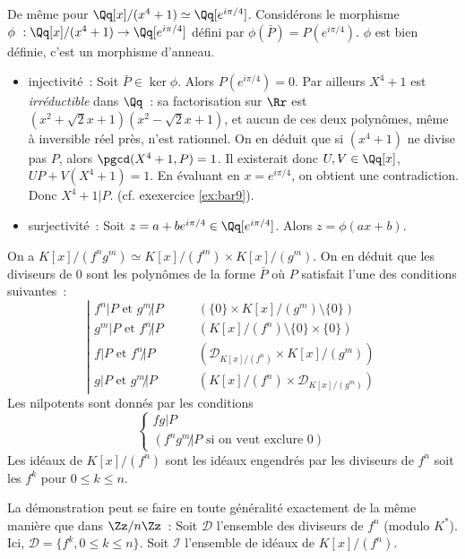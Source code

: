 {\begin{enumerate}
{De même pour $\Qq[x]/(x^{4}+1)\simeq\Qq[e^{i\pi/4}]$. Considérons le
morphisme $\phi~:\Qq[x]/(x^{4}+1)\to\Qq[e^{i\pi/4}]$ défini par
$\phi(\bar P)=P(e^{i\pi/4})$. $\phi$ est bien définie, c'est un morphisme
d'anneau.
\begin{itemize}
\item injectivité~:
  Soit $\bar{P}\in\ker\phi$. Alors $P(e^{i\pi/4})=0$. Par ailleurs
  $X^{4}+1$ est \emph{irréductible} dans $\Qq$~: sa factorisation sur
  $\Rr$ est $(x^{2}+\sqrt{2}x+1)(x^{2}-\sqrt{2}x+1)$, et aucun de ces
  deux polynômes, même à inversible réel près, n'est rationnel. On en
  déduit que si $(x^{4}+1)$ ne divise pas $P$, alors $\pgcd(X^{4}+1,P)=1$.
  Il existerait donc $U,V\in\Qq[x]$, $UP+V(X^{4}+1)=1$. En évaluant en
  $x=e^{i\pi/4}$, on obtient une contradiction. Donc $X^{4}+1|P$. (cf.
  exexercice \ref{ex:bar9}).
\item surjectivité~:
  Soit $z=a+be^{i\pi/4}\in\Qq[e^{i\pi/4}]$. Alors $z=\phi(ax+b)$.
\end{itemize}
On a $K[x]/(f^{n}g^{m})\simeq K[x]/(f^{m})\times K[x]/(g^{m})$. On en
  déduit que les diviseurs de $0$ sont les polynômes de la forme
  $\bar{P}$ où $P$ satisfait l'une des conditions suivantes~:
$$
\left|
\begin{array}{ll}
  f^{n}|P \text{ et } g^{m}\!\!\!\not| P & \qquad(\{0\}\times K[x]/(g^{m})\setminus\{0\})\\
  g^{m}|P \text{ et } f^{n}\!\!\!\not| P & \qquad(K[x]/(f^{n})\setminus\{0\}\times \{0\})\\
  f|P \text{ et } f^{n}\!\!\!\not| P & \qquad (\mathcal{D}_{K[x]/(f^{n})}\times K[x]/(g^{m}))\\
  g|P \text{ et } g^{m}\!\!\!\not| P & \qquad (K[x]/(f^{n})\times\mathcal{D}_{ K[x]/(g^{m})})
\end{array}\right.
$$
Les nilpotents sont donnés par les conditions
$$
\left\{
\begin{array}{ll}
  fg|P\\
  (f^{n}g^{m}\!\!\!\not| P \text{ si on veut exclure }0)
\end{array}\right.
$$
Les idéaux de $K[x]/(f^{n})$ sont les idéaux engendrés par les
   diviseurs de $f^{n}$ soit les $f^{k}$ pour $0\leq k\leq n$.

   \smallskip

   La démonstration peut se faire en toute généralité exactement de la
   même manière que dans $\Zz/n\Zz$~: Soit $\mathcal{D}$ l'ensemble des
   diviseurs de $f^{n}$ (modulo $K^{*}$). Ici, $\mathcal{D}=\{f^{k},0\leq
   k\leq n\}$. Soit $\mathcal{I}$ l'ensemble de idéaux de $K[x]/(f^{n})$.

}
\end{enumerate}}

